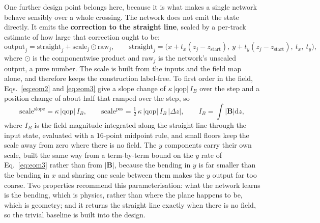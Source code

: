\documentclass[11pt,a4paper]{article}
\newcommand{\qop}{\ensuremath{\mathrm{qop}}}
\begin{document}
One further design point belongs here, because it is what makes a single
network behave sensibly over a whole crossing. The network does not emit the
state directly. It emits the \textbf{correction to the straight line}, scaled by
a per-track estimate of how large that correction ought to be:
%
\begin{equation}
  \mathrm{output}_j = \mathrm{straight}_j
     + \mathrm{scale}_j \odot \mathrm{raw}_j,
  \qquad
  \mathrm{straight}_j = \big(x + t_x (z_j - z_{\mathrm{start}}),\
     y + t_y (z_j - z_{\mathrm{start}}),\ t_x,\ t_y\big),
  \label{eq:straight}
\end{equation}
%
where $\odot$ is the componentwise product and $\mathrm{raw}_j$ is the network's
unscaled output, a pure number. The scale is built from the inputs and the
field map alone, and therefore keeps the construction label-free. To first
order in the field, Eqs.~\eqref{eq:eom2} and \eqref{eq:eom3} give a slope
change of $\kappa\,|\qop|\,I_B$ over the step and a position change of about
half that ramped over the step, so
%
\begin{equation}
  \mathrm{scale}^{\text{slope}} = \kappa\,|\qop|\,I_B,
  \qquad
  \mathrm{scale}^{\text{pos}} = \tfrac12\,\kappa\,|\qop|\,I_B\,|\Delta z|,
  \qquad
  I_B = \int \left|\mathbf{B}\right| \mathrm{d}z,
  \label{eq:scale}
\end{equation}
%
where $I_B$ is the field magnitude integrated along the straight line through
the input state, evaluated with a $16$-point midpoint rule, and small floors
keep the scale away from zero where there is no field. The $y$ components
carry their own scale, built the same way from a term-by-term bound on the
$y$ rate of Eq.~\eqref{eq:eom3} rather than from $|\mathbf{B}|$, because the
bending in $y$ is far smaller than the bending in $x$ and sharing one scale
between them makes the $y$ output far too coarse. Two properties recommend this
parameterisation: what the network learns is the bending, which is physics,
rather than where the plane happens to be, which is geometry; and it returns
the straight line exactly when there is no field, so the trivial baseline is
built into the design.
\end{document}
